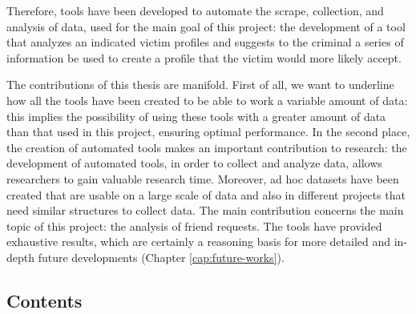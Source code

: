 \par \noindent Therefore, tools have been developed to automate the scrape, collection, and analysis of data, used for the main goal of this project: the development of a tool that analyzes an indicated victim profiles and suggests to the criminal a series of information be used to create a profile that the victim would more likely accept.
\par \noindent The contributions of this thesis are manifold. 
First of all, we want to underline how all the tools have been created to be able to work a variable amount of data: this implies the possibility of using these tools with a greater amount of data than that used in this project, ensuring optimal performance.
In the second place, the creation of automated tools makes an important contribution to research: the development of automated tools, in order to collect and analyze data, allows researchers to gain valuable research time.
Moreover, ad hoc datasets have been created that are usable on a large scale of data and also in different projects that need similar structures to collect data. The main contribution concerns the main topic of this project: the analysis of friend requests. The tools have provided exhaustive results, which are certainly a reasoning basis for more detailed and in-depth future developments (Chapter \ref{cap:future-works}).

\subsection*{Contents}

